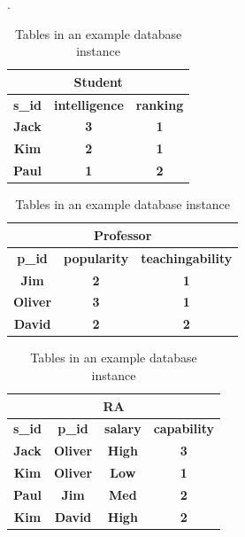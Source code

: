 \begin{table}[htbp]
  \centering
  \caption{Tables in an example database instance} .
    \begin{tabular}{|c|c|c|}
    \multicolumn{3}{c}{\textbf{ Student}} \\ \hline
    \textbf{s\_id} & \textbf{intelligence} & \textbf{ranking} \\  \hline

    \textbf{Jack} & \textbf{3} & \textbf{1} \\  \hline

    \textbf{Kim} & \textbf{2} & \textbf{1} \\  \hline

    \textbf{Paul} & \textbf{1} & \textbf{2} \\  \hline

    \end{tabular}%
    
      \begin{tabular}{|c|c|c|}

    \multicolumn{3}{c}{\textbf{ Professor}} \\  \hline

    \textbf{p\_id} & \textbf{popularity} & \textbf{teachingability} \\  \hline

    \textbf{Jim} & \textbf{2} & \textbf{1} \\  \hline

    \textbf{Oliver} & \textbf{3} & \textbf{1} \\  \hline
 
    \textbf{David} & \textbf{2} & \textbf{2} \\  \hline

    \end{tabular}%

    \begin{tabular}{|c|c|c|c|}

    \multicolumn{4}{c}{\textbf{ RA }} \\ \hline

    \textbf{s\_id} & \textbf{p\_id} & \textbf{salary} & \textbf{capability} \\ \hline

    \textbf{Jack} & \textbf{Oliver} & \textbf{High} & \textbf{3} \\ \hline

    \textbf{Kim} & \textbf{Oliver} & \textbf{Low} & \textbf{1} \\ \hline

    \textbf{Paul} & \textbf{Jim} & \textbf{Med} & \textbf{2} \\ \hline

    \textbf{Kim} & \textbf{David} & \textbf{High} & \textbf{2} \\ \hline

    \end{tabular}%

  \label{tab:instances}%
\end{table}%


